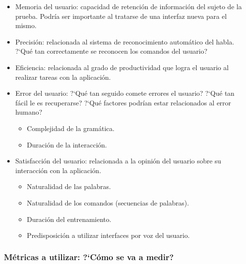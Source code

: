 \begin{itemize}
    \item Memoria del usuario: capacidad de retenci\'on de informaci\'on del sujeto de la prueba. 
    Podr\'ia ser importante al tratarse de una interfaz nueva para el mismo. 
    \item Precisi\'on: relacionada al sistema de reconocimiento autom\'atico del habla. 
    {?`}Qu\'e tan correctamente se reconocen los comandos del usuario?
    \item Eficiencia: relacionada al grado de productividad que logra el usuario al realizar tareas con
    la aplicaci\'on.
    \item Error del usuario: {?`}Qu\'e tan seguido comete errores el usuario? {?`}Qu\'e tan f\'acil le es recuperarse? {?`}Qu\'e factores podrían estar relacionados al error humano?
    \begin{itemize}
        \item Complejidad de la gram\'atica.
        \item Duración de la interacción.
    \end{itemize}
    \item Satisfacci\'on del usuario: relacionada a la opini\'on del usuario sobre su interacci\'on con la aplicaci\'on.
    \begin{itemize}
        \item Naturalidad de las palabras.
        \item Naturalidad de los comandos (secuencias de palabras).
        \item Duración del entrenamiento.
        \item Predisposición a utilizar interfaces por voz del usuario.
    \end{itemize}
\end{itemize}



\subsubsection{M\'etricas a utilizar: {?`}C\'omo se va a medir?}

